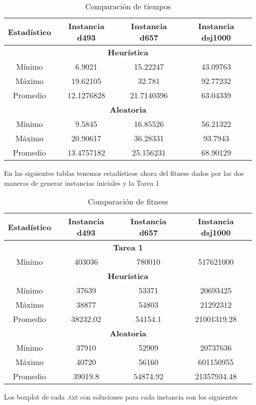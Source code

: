 \documentclass[11pt, letterpaper]{article}
\theoremstyle{definition}
\begin{document}
\begin{table}[H]
    \centering
    \begin{tabular}{|c|c|c|c|}
    	\hline
        \textbf{Estadístico} & \textbf{Instancia d493} & \textbf{Instancia d657} &\textbf{Instancia dsj1000} \\ 
    	\hline
    	\multicolumn{4}{|c|}{\textbf{Heurística}} \\
        \hline
        Mínimo  & 6.9021  & 15.22247 & 43.09763\\  
        \hline
        Máximo  & 19.62105  & 32.781 & 92.77232\\  
        \hline
        Promedio & 12.1276828  & 21.7140396 & 63.04339\\
    	\hline
    	\multicolumn{4}{|c|}{\textbf{Aleatoria}} \\
        \hline
        Mínimo  & 9.5845  & 16.85526 & 56.21322\\  
        \hline
        Máximo  & 20.90617  & 36.28331 & 93.7943\\  
        \hline
        Promedio & 13.4757182  & 25.156231 & 68.90129	\\    
        \hline
    \end{tabular}
    \caption{Comparación de tiempos}
    \label{tab:estadisticos2}
\end{table}

\noindent En las siguientes tablas tenemos estadísticos ahora del fitness dados por las dos maneras de generar instancias iniciales y la Tarea 1

\begin{table}[H]
    \centering
    \begin{tabular}{|c|c|c|c|}
    	\hline
        \textbf{Estadístico} & \textbf{Instancia d493} & \textbf{Instancia d657} &\textbf{Instancia dsj1000} \\ 
        \hline
    	\multicolumn{4}{|c|}{\textbf{Tarea 1}} \\
        \hline
        Mínimo & 403036  & 780010 & 517621000\\ 
    	\hline
        \multicolumn{4}{|c|}{\textbf{Heurística}} \\
        \hline
        Mínimo  & 37639  & 53371  & 20693425\\  
        \hline
        Máximo  & 38877  & 54803 & 21292312\\  
        \hline
        Promedio & 38232.02  & 54154.1 & 21001319.28\\  
    	\hline
    	\multicolumn{4}{|c|}{\textbf{Aleatoria}} \\
        \hline
        Mínimo  & 37910  & 52909 & 20737636\\  
        \hline
        Máximo  & 40720 & 56160 & 601150955\\  
        \hline
        Promedio & 39019.8  & 54874.92 & 21357934.48\\  
        \hline
    \end{tabular}
    \caption{Comparación de fitness}
    \label{tab:estadisticos2}
\end{table}
\noindent Los boxplot de cada .txt con soluciones para cada instancia son los siguientes
\end{document}

